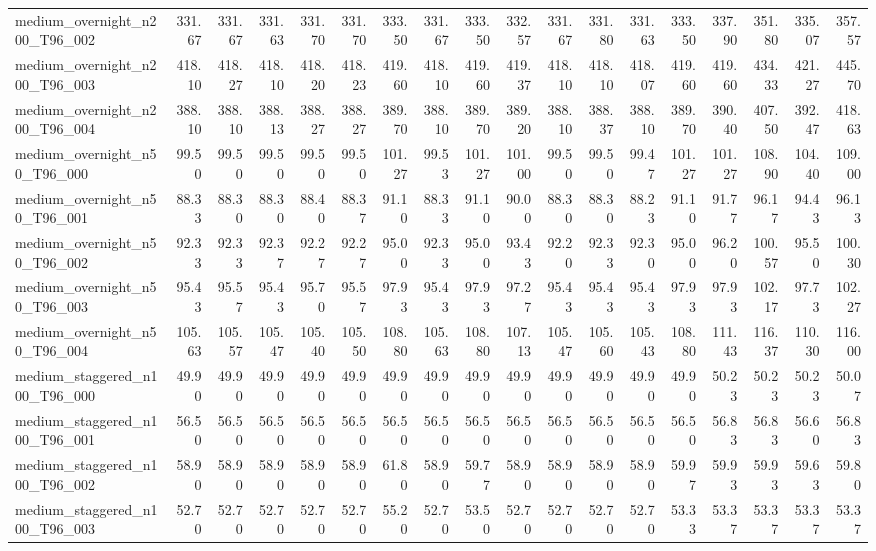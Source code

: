 \begin{table}[htbp]
\begin{tabular}{lrrrrrrrrrrrrrrrrr}
medium\_overnight\_n200\_T96\_002 & 331.67 & 331.67 & 331.63 & 331.70 & 331.70 & 333.50 & 331.67 & 333.50 & 332.57 & 331.67 & 331.80 & 331.63 & 333.50 & 337.90 & 351.80 & 335.07 & 357.57 \\
medium\_overnight\_n200\_T96\_003 & 418.10 & 418.27 & 418.10 & 418.20 & 418.23 & 419.60 & 418.10 & 419.60 & 419.37 & 418.10 & 418.10 & 418.07 & 419.60 & 419.60 & 434.33 & 421.27 & 445.70 \\
medium\_overnight\_n200\_T96\_004 & 388.10 & 388.10 & 388.13 & 388.27 & 388.27 & 389.70 & 388.10 & 389.70 & 389.20 & 388.10 & 388.37 & 388.10 & 389.70 & 390.40 & 407.50 & 392.47 & 418.63 \\
medium\_overnight\_n50\_T96\_000 & 99.50 & 99.50 & 99.50 & 99.50 & 99.50 & 101.27 & 99.53 & 101.27 & 101.00 & 99.50 & 99.50 & 99.47 & 101.27 & 101.27 & 108.90 & 104.40 & 109.00 \\
medium\_overnight\_n50\_T96\_001 & 88.33 & 88.30 & 88.30 & 88.40 & 88.37 & 91.10 & 88.33 & 91.10 & 90.00 & 88.30 & 88.30 & 88.23 & 91.10 & 91.77 & 96.17 & 94.43 & 96.13 \\
medium\_overnight\_n50\_T96\_002 & 92.33 & 92.33 & 92.37 & 92.27 & 92.27 & 95.00 & 92.33 & 95.00 & 93.43 & 92.20 & 92.33 & 92.30 & 95.00 & 96.20 & 100.57 & 95.50 & 100.30 \\
medium\_overnight\_n50\_T96\_003 & 95.43 & 95.57 & 95.43 & 95.70 & 95.57 & 97.93 & 95.43 & 97.93 & 97.27 & 95.43 & 95.43 & 95.43 & 97.93 & 97.93 & 102.17 & 97.73 & 102.27 \\
medium\_overnight\_n50\_T96\_004 & 105.63 & 105.57 & 105.47 & 105.40 & 105.50 & 108.80 & 105.63 & 108.80 & 107.13 & 105.47 & 105.60 & 105.43 & 108.80 & 111.43 & 116.37 & 110.30 & 116.00 \\
medium\_staggered\_n100\_T96\_000 & 49.90 & 49.90 & 49.90 & 49.90 & 49.90 & 49.90 & 49.90 & 49.90 & 49.90 & 49.90 & 49.90 & 49.90 & 49.90 & 50.23 & 50.23 & 50.23 & 50.07 \\
medium\_staggered\_n100\_T96\_001 & 56.50 & 56.50 & 56.50 & 56.50 & 56.50 & 56.50 & 56.50 & 56.50 & 56.50 & 56.50 & 56.50 & 56.50 & 56.50 & 56.83 & 56.83 & 56.60 & 56.83 \\
medium\_staggered\_n100\_T96\_002 & 58.90 & 58.90 & 58.90 & 58.90 & 58.90 & 61.80 & 58.90 & 59.77 & 58.90 & 58.90 & 58.90 & 58.90 & 59.97 & 59.93 & 59.93 & 59.63 & 59.80 \\
medium\_staggered\_n100\_T96\_003 & 52.70 & 52.70 & 52.70 & 52.70 & 52.70 & 55.20 & 52.70 & 53.50 & 52.70 & 52.70 & 52.70 & 52.70 & 53.33 & 53.37 & 53.37 & 53.37 & 53.37 \\

\end{tabular}
\end{table}
